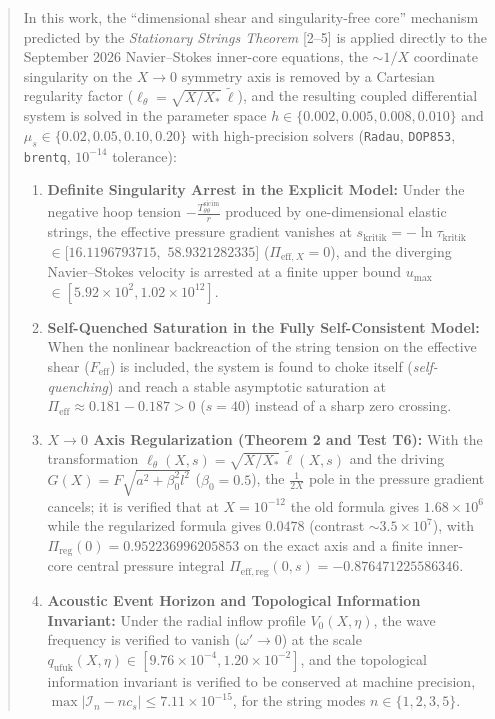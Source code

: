 \documentclass[12pt,a4paper]{article}
\begin{document}
\begin{abstract}
In this work, the ``dimensional shear and singularity-free core'' mechanism predicted by the \textit{Stationary Strings Theorem} [2--5] is applied directly to the September 2026 Navier--Stokes inner-core equations, the $\sim 1/X$ coordinate singularity on the $X \to 0$ symmetry axis is removed by a Cartesian regularity factor ($\ell_\theta = \sqrt{X/X_*}\,\tilde{\ell}$), and the resulting coupled differential system is solved in the parameter space $h \in \{0.002, 0.005, 0.008, 0.010\}$ and $\mu_s \in \{0.02, 0.05, 0.10, 0.20\}$ with high-precision solvers (\texttt{Radau}, \texttt{DOP853}, \texttt{brentq}, $10^{-14}$ tolerance):
\begin{enumerate}
    \item \textbf{Definite Singularity Arrest in the Explicit Model:} Under the negative hoop tension $-\frac{T_{\theta\theta}^{\mathrm{sicim}}}{r}$ produced by one-dimensional elastic strings, the effective pressure gradient vanishes at $s_{\mathrm{kritik}} = -\ln \tau_{\mathrm{kritik}}$ $\in [16.1196793715,$ $58.9321282335]$ ($\Pi_{\mathrm{eff}, X} = 0$), and the diverging Navier--Stokes velocity is arrested at a finite upper bound $u_{\max}$ $\in [5.92 \times 10^2, 1.02 \times 10^{12}]$.
    \item \textbf{Self-Quenched Saturation in the Fully Self-Consistent Model:} When the nonlinear backreaction of the string tension on the effective shear ($F_{\mathrm{eff}}$) is included, the system is found to choke itself (\textit{self-quenching}) and reach a stable asymptotic saturation at $\Pi_{\mathrm{eff}} \approx 0.181 - 0.187 > 0$ ($s=40$) instead of a sharp zero crossing.
    \item \textbf{$X \to 0$ Axis Regularization (Theorem 2 and Test T6):} With the transformation $\ell_\theta(X,s) = \sqrt{X/X_*}\,\tilde{\ell}(X,s)$ and the driving $G(X) = F\sqrt{a^2 + \beta_0^2 l^2}$ ($\beta_0 = 0.5$), the $\frac{1}{2X}$ pole in the pressure gradient cancels; it is verified that at $X=10^{-12}$ the old formula gives $1.68 \times 10^6$ while the regularized formula gives $0.0478$ (contrast $\sim 3.5 \times 10^7$), with $\Pi_{\mathrm{reg}}(0) = 0.952236996205853$ on the exact axis and a finite inner-core central pressure integral $\Pi_{\mathrm{eff,reg}}(0,s) = -0.876471225586346$.
    \item \textbf{Acoustic Event Horizon and Topological Information Invariant:} Under the radial inflow profile $V_0(X,\eta)$, the wave frequency is verified to vanish ($\omega' \to 0$) at the scale $q_{\mathrm{ufuk}}(X,\eta) \in [9.76 \times 10^{-4}, 1.20 \times 10^{-2}]$, and the topological information invariant is verified to be conserved at machine precision, $\max|\mathcal{I}_n - n c_s| \le 7.11 \times 10^{-15}$, for the string modes $n \in \{1,2,3,5\}$.

\end{enumerate}
\end{abstract}
\end{document}
